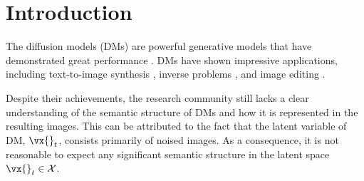 \section{Introduction}
The diffusion models (DMs) are powerful generative models that have demonstrated great performance \cite{ho2020denoising, song2020denoising, song2020score, dhariwal2021diffusion, nichol2021improved}. 
DMs have shown impressive applications, including text-to-image synthesis \cite{ramesh2022hierarchical, rombach2022high, balaji2022ediffi, nichol2021glide}, inverse problems \cite{lugmayr2022repaint, chung2022improving, lugmayr2022repaint}, and image editing \cite{hertz2022prompt, tumanyan2022plug, parmar2023zero, mokady2022null}.


Despite their achievements, the research community still lacks a clear understanding of the semantic structure of DMs and how it is represented in the resulting images.
This can be attributed to the fact that the latent variable of DM, $\vx{}_t$, consists primarily of noised images.
As a consequence, it is not reasonable to expect any significant semantic structure in the latent space $\vx{}_t \in \mathcal{X}$.


